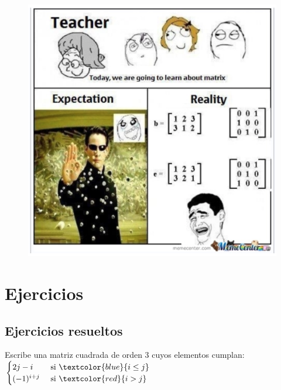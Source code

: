 \begin{figure}[H]
	\centering
	\includegraphics[width=1\textwidth]{imagenes/imagenes03/T03IM02.png}
\end{figure}









\section {Ejercicios}
\subsection {Ejercicios resueltos}

\begin{ejre}
	Escribe una matriz cuadrada de orden $3$ cuyos elementos cumplan: $\begin{cases}  2j-i & \text{ si } \textcolor{blue}{i \le j} \\ (-1)^{i+j} & \text{ si } \textcolor{red}{i>j}  \end{cases}$
\end{ejre}

